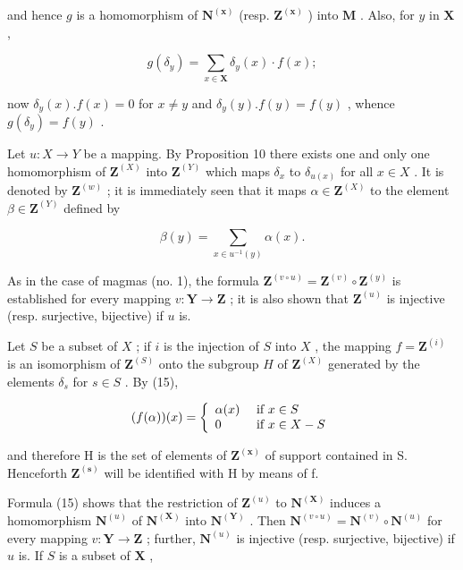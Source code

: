 and hence \(g\) is a homomorphism of \(\mathbf{N}^{(\mathbf{x})}\) (resp. \(\mathbf{Z}^{(\mathbf{x})}\) ) into \(\mathbf{M}\) . Also, for \(y\) in \(\mathbf{X}\) ,

\[
g (\delta_ {y}) = \sum_ {x \in \mathbf {X}} \delta_ {y} (x) \cdot f (x);
\]

now \(\delta_y(x).f(x) = 0\) for \(x\neq y\) and \(\delta_y(y).f(y) = f(y)\) , whence \(g(\delta_y) = f(y)\) .

Let \(u: X \to Y\) be a mapping. By Proposition 10 there exists one and only one homomorphism of \(\mathbf{Z}^{(X)}\) into \(\mathbf{Z}^{(Y)}\) which maps \(\delta_x\) to \(\delta_{u(x)}\) for all \(x \in X\) . It is denoted by \(\mathbf{Z}^{(w)}\) ; it is immediately seen that it maps \(\alpha \in \mathbf{Z}^{(X)}\) to the element \(\beta \in \mathbf{Z}^{(Y)}\) defined by

\[
\beta (y) = \sum_ {x \in u ^ {- 1} (y)} \alpha (x).\tag{15}
\]

As in the case of magmas (no. 1), the formula \(\mathbf{Z}^{(v\circ u)} = \mathbf{Z}^{(v)}\circ \mathbf{Z}^{(y)}\) is established for every mapping \(v\colon \mathbf{Y}\to \mathbf{Z}\) ; it is also shown that \(\mathbf{Z}^{(u)}\) is injective (resp. surjective, bijective) if \(u\) is.

Let \(S\) be a subset of \(X\) ; if \(i\) is the injection of \(S\) into \(X\) , the mapping \(f = \mathbf{Z}^{(i)}\) is an isomorphism of \(\mathbf{Z}^{(S)}\) onto the subgroup \(H\) of \(\mathbf{Z}^{(X)}\) generated by the elements \(\delta_s\) for \(s \in S\) . By (15),

\[
(f (\alpha)) (x) = \left\{ \begin{array}{l l} \alpha (x) & \text { if } x \in S \\ 0 & \text { if } x \in X - S \end{array} \right.
\]

and therefore H is the set of elements of \(\mathbf{Z}^{(\mathbf{x})}\) of support contained in S. Henceforth \(\mathbf{Z}^{(\mathbf{s})}\) will be identified with H by means of f.

Formula (15) shows that the restriction of \(\mathbf{Z}^{(u)}\) to \(\mathbf{N}^{(\mathbf{X})}\) induces a homomorphism \(\mathbf{N}^{(u)}\) of \(\mathbf{N}^{(\mathbf{X})}\) into \(\mathbf{N}^{(\mathbf{Y})}\) . Then \(\mathbf{N}^{(v\circ u)} = \mathbf{N}^{(v)}\circ \mathbf{N}^{(u)}\) for every mapping \(v\colon \mathbf{Y}\to \mathbf{Z}\) ; further, \(\mathbf{N}^{(u)}\) is injective (resp. surjective, bijective) if \(u\) is. If \(S\) is a subset of \(\mathbf{X}\) ,

